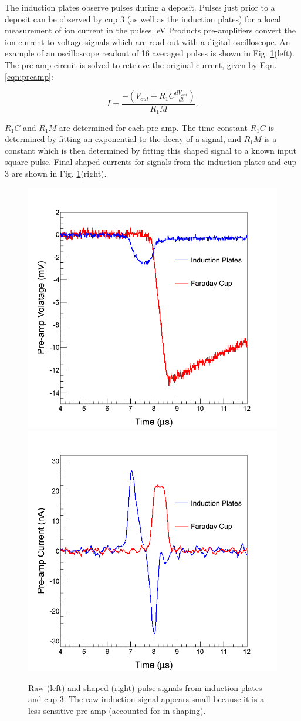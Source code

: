 The induction plates observe pulses during a deposit.  Pulses just prior to a deposit can be observed by cup 3 (as well as the induction plates) for a local measurement of ion current in the pulses.  eV Products pre-amplifiers convert the ion current to voltage signals which are read out with a digital oscilloscope.  An example of an oscilloscope readout of 16 averaged pulses is shown in Fig. \ref{fig:pulse_raw_shaped}(left).  The pre-amp circuit is solved to retrieve the original current, given by Eqn. \ref{eqn:preamp}:

\begin{equation}
I = \frac{-(V_{out} + R_{1} C \frac{dV_{out}}{dt})}{R_{1} M}.
\label{eqn:preamp}
\end{equation}

\noindent
$R_{1} C$ and $R_{1} M$ are determined for each pre-amp.  The time constant $R_{1} C$ is determined by fitting an exponential to the decay of a signal, and $R_{1} M$ is a constant which is then determined by fitting this shaped signal to a known input square pulse.  Final shaped currents for signals from the induction plates and cup 3 are shown in Fig. \ref{fig:pulse_raw_shaped}(right).

\begin{figure} %
                \includegraphics[width=.49\textwidth]{figures/pulse_ind_cup3_raw.png}
                \includegraphics[width=.49\textwidth]{figures/pulse_ind_cup3_shaped.png}
                \caption{Raw (left) and shaped (right) pulse signals from induction plates and cup 3.  The raw induction signal appears small because it is a less sensitive pre-amp (accounted for in shaping).}
        \label{fig:pulse_raw_shaped}
\end{figure}

